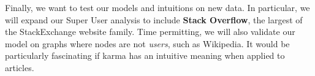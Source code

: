 \documentclass[10pt]{article}
\begin{document}
Finally, we want to test our models and intuitions on new data. In particular, we 
will expand our Super User analysis to include \textbf{Stack Overflow}, the largest
of the StackExchange website family. Time permitting, we will also validate our
model on graphs where nodes are not \textit{users}, such as Wikipedia. It would
be particularly fascinating if karma has an intuitive meaning when applied to 
articles. 



\end{document}

